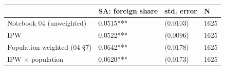\begin{tabular}{llll}
\toprule
 & SA: foreign share & std. error & N \\
\midrule
Notebook 04 (unweighted) & 0.0515*** & (0.0103) & 1625 \\
IPW & 0.0522*** & (0.0096) & 1625 \\
Population-weighted (04 §7) & 0.0642*** & (0.0178) & 1625 \\
IPW × population & 0.0620*** & (0.0173) & 1625 \\
\bottomrule
\end{tabular}
